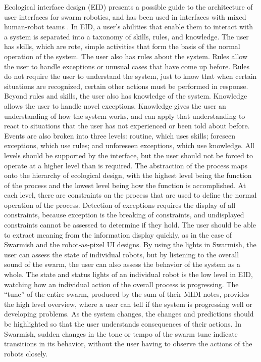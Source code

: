 \documentclass[]{article}
\begin{document}
Ecological interface design (EID) presents a possible guide to the architecture of user interfaces for swarm robotics, and has been used in interfaces with mixed human-robot teams \cite{vicente1992ecological, gancet2010user}. 
In EID, a user's abilities that enable them to interact with a system is separated into a taxonomy of skills, rules, and knowledge. 
The user has skills, which are rote, simple activities that form the basis of the normal operation of the system. 
The user also has rules about the system. 
Rules allow the user to handle exceptions or unusual cases that have come up before. 
Rules do not require the user to understand the system, just to know that when certain situations are recognized, certain other actions must be performed in response. 
Beyond rules and skills, the user also has knowledge of the system. 
Knowledge allows the user to handle novel exceptions. 
Knowledge gives the user an understanding of how the system works, and can apply that understanding to react to situations that the user has not experienced or been told about before. 
Events are also broken into three levels: routine, which uses skills; foreseen exceptions, which use rules; and unforeseen exceptions, which use knowledge. 
All levels should be supported by the interface, but the user should not be forced to operate at a higher level than is required. 
The abstraction of the process maps onto the hierarchy of ecological design, with the highest level being the function of the process and the lowest level being how the function is accomplished. 
At each level, there are constraints on the process that are used to define the normal operation of the process.
Detection of exceptions requires the display of all constraints, because exception is the breaking of constraints, and undisplayed constraints cannot be assessed to determine if they hold.
The user should be able to extract meaning from the information display quickly, as in the case of Swarmish and the robot-as-pixel UI designs.
By using the lights in Swarmish, the user can assess the state of individual robots, but by listening to the overall sound of the swarm, the user can also assess the behavior of the system as a whole.
The state and status lights of an individual robot is the low level in EID, watching how an individual action of the overall process is progressing. 
The ``tune'' of the entire swarm, produced by the sum of their MIDI notes, provides the high level overview, where a user can tell if the system is progressing well or developing problems. 
As the system changes, the changes and predictions should be highlighted so that the user understands consequences of their actions. 
In Swarmish, sudden changes in the tone or tempo of the swarm tune indicate transitions in its behavior, without the user having to observe the actions of the robots closely. 
\end{document}
